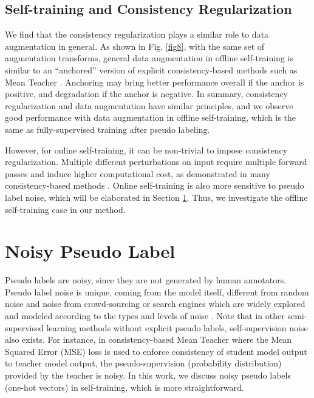 \documentclass[preprint,review,10pt]{elsarticle}
\begin{document}
\subsection{Self-training and Consistency Regularization}
\label{sec:22}
We find that the consistency regularization plays a similar role to data augmentation in general. As shown in Fig. \ref{fig8}, with the same set of augmentation transforms, general data augmentation in offline self-training is similar to an ``anchored'' version of explicit consistency-based methods such as Mean Teacher \cite{tarvainen2017mean}. Anchoring may bring better performance overall if the anchor is positive, and degradation if the anchor is negative. In summary, consistency regularization and data augmentation have similar principles, and we observe good performance with data augmentation in offline self-training, which is the same as fully-supervised training after pseudo labeling.

However, for online self-training, it can be non-trivial to impose consistency regularization. Multiple different perturbations on input require multiple forward passes and induce higher computational cost, as demonstrated in many consistency-based methods \cite{laine2017temporal,tarvainen2017mean}. Online self-training is also more sensitive to pseudo label noise, which will be elaborated in Section \ref{sec:3}. Thus, we investigate the offline self-training case in our method. 

\section{Noisy Pseudo Label}
\label{sec:3}

Pseudo labels are noisy, since they are not generated by human annotators. Pseudo label noise is unique, coming from the model itself, different from random noise and noise from crowd-sourcing or search engines which are widely explored and modeled according to the types and levels of noise \cite{angluin1988learning,zhang2017understanding,goldberger2017training,malach2017decoupling}. Note that in other semi-supervised learning methods without explicit pseudo labels, self-supervision noise also exists. For instance, in consistency-based Mean Teacher \cite{tarvainen2017mean} where the Mean Squared Error (MSE) loss is used to enforce consistency of student model output to teacher model output, the pseudo-supervision (probability distribution) provided by the teacher is noisy. In this work, we discuss noisy pseudo labels (one-hot vectors) in self-training, which is more straightforward.
\end{document}
